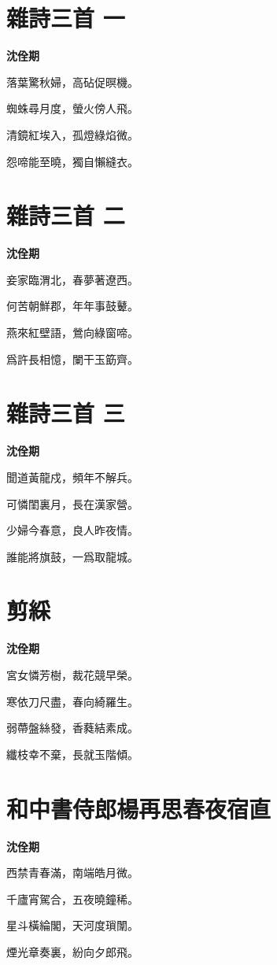\documentclass[12pt,a4paper]{ctexbook}
\begin{document}
\section{雜詩三首 一}
\textbf{沈佺期}\par\vspace{0.5em}
落葉驚秋婦，高砧促暝機。\par
蜘蛛尋月度，螢火傍人飛。\par
清鏡紅埃入，孤燈綠焰微。\par
怨啼能至曉，獨自懶縫衣。\par

\section{雜詩三首 二}
\textbf{沈佺期}\par\vspace{0.5em}
妾家臨渭北，春夢著遼西。\par
何苦朝鮮郡，年年事鼓鼙。\par
燕來紅壁語，鶯向綠窗啼。\par
爲許長相憶，闌干玉筯齊。\par

\section{雜詩三首 三}
\textbf{沈佺期}\par\vspace{0.5em}
聞道黃龍戍，頻年不解兵。\par
可憐閨裏月，長在漢家營。\par
少婦今春意，良人昨夜情。\par
誰能將旗鼓，一爲取龍城。\par

\section{剪綵}
\textbf{沈佺期}\par\vspace{0.5em}
宮女憐芳樹，裁花競早榮。\par
寒依刀尺盡，春向綺羅生。\par
弱蔕盤絲發，香蕤結素成。\par
纖枝幸不棄，長就玉階傾。\par

\section{和中書侍郎楊再思春夜宿直}
\textbf{沈佺期}\par\vspace{0.5em}
西禁青春滿，南端皓月微。\par
千廬宵駕合，五夜曉鐘稀。\par
星斗橫綸閣，天河度瑣闈。\par
煙光章奏裏，紛向夕郎飛。\par
\end{document}
